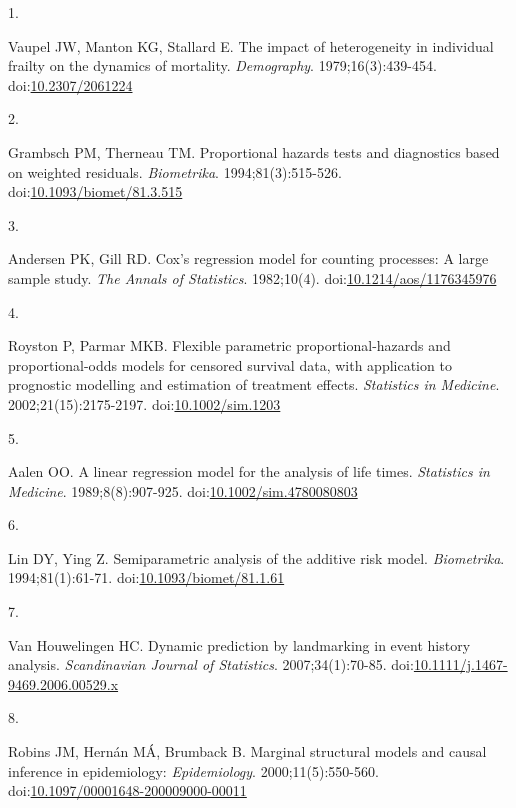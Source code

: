 \documentclass[
]{article}
\newlength{\cslhangindent}
\newlength{\csllabelwidth}
\newenvironment{CSLReferences}[2] %
 {\begin{list}{}{%
  \setlength{\itemindent}{0pt}
  \setlength{\leftmargin}{0pt}
  \setlength{\parsep}{0pt}
  \ifodd #1
   \setlength{\leftmargin}{\cslhangindent}
   \setlength{\itemindent}{-1\cslhangindent}
  \fi
  \setlength{\itemsep}{#2\baselineskip}}}
 {\end{list}}
\newcommand{\CSLLeftMargin}[1]{\parbox[t]{\csllabelwidth}{\strut#1\strut}}
\newcommand{\CSLRightInline}[1]{\parbox[t]{\linewidth - \csllabelwidth}{\strut#1\strut}}
\begin{document}
\protect{}\label{refs}
\begin{CSLReferences}{0}{1}
\CSLLeftMargin{1. }%
\CSLRightInline{Vaupel JW, Manton KG, Stallard E. The impact of heterogeneity in individual frailty on the dynamics of mortality. \emph{Demography}. 1979;16(3):439-454. doi:\href{https://doi.org/10.2307/2061224}{10.2307/2061224}}

\CSLLeftMargin{2. }%
\CSLRightInline{Grambsch PM, Therneau TM. Proportional hazards tests and diagnostics based on weighted residuals. \emph{Biometrika}. 1994;81(3):515-526. doi:\href{https://doi.org/10.1093/biomet/81.3.515}{10.1093/biomet/81.3.515}}

\CSLLeftMargin{3. }%
\CSLRightInline{Andersen PK, Gill RD. Cox's regression model for counting processes: A large sample study. \emph{The Annals of Statistics}. 1982;10(4). doi:\href{https://doi.org/10.1214/aos/1176345976}{10.1214/aos/1176345976}}

\CSLLeftMargin{4. }%
\CSLRightInline{Royston P, Parmar MKB. Flexible parametric proportional-hazards and proportional-odds models for censored survival data, with application to prognostic modelling and estimation of treatment effects. \emph{Statistics in Medicine}. 2002;21(15):2175-2197. doi:\href{https://doi.org/10.1002/sim.1203}{10.1002/sim.1203}}

\CSLLeftMargin{5. }%
\CSLRightInline{Aalen OO. A linear regression model for the analysis of life times. \emph{Statistics in Medicine}. 1989;8(8):907-925. doi:\href{https://doi.org/10.1002/sim.4780080803}{10.1002/sim.4780080803}}

\CSLLeftMargin{6. }%
\CSLRightInline{Lin DY, Ying Z. Semiparametric analysis of the additive risk model. \emph{Biometrika}. 1994;81(1):61-71. doi:\href{https://doi.org/10.1093/biomet/81.1.61}{10.1093/biomet/81.1.61}}

\CSLLeftMargin{7. }%
\CSLRightInline{Van Houwelingen HC. Dynamic prediction by landmarking in event history analysis. \emph{Scandinavian Journal of Statistics}. 2007;34(1):70-85. doi:\href{https://doi.org/10.1111/j.1467-9469.2006.00529.x}{10.1111/j.1467-9469.2006.00529.x}}

\CSLLeftMargin{8. }%
\CSLRightInline{Robins JM, Hernán MÁ, Brumback B. Marginal structural models and causal inference in epidemiology: \emph{Epidemiology}. 2000;11(5):550-560. doi:\href{https://doi.org/10.1097/00001648-200009000-00011}{10.1097/00001648-200009000-00011}}


\end{CSLReferences}
\end{document}
